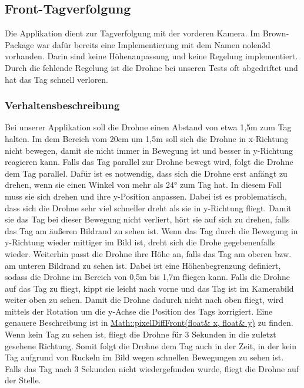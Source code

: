\subsection*{Front-\/Tagverfolgung }

Die Applikation dient zur Tagverfolgung mit der vorderen Kamera. Im Brown-\/Package war dafür bereits eine Implementierung mit dem Namen nolen3d vorhanden. Darin sind keine Höhenanpassung und keine Regelung implementiert. Durch die fehlende Regelung ist die Drohne bei unseren Tests oft abgedriftet und hat das Tag schnell verloren.

\subsubsection*{Verhaltensbeschreibung }

Bei unserer Applikation soll die Drohne einen Abstand von etwa 1,5m zum Tag halten. Im dem Bereich vom 20cm um 1,5m soll sich die Drohne in x-\/Richtung nicht bewegen, damit sie nicht immer in Bewegung ist und besser in y-\/Richtung reagieren kann. Falls das Tag parallel zur Drohne bewegt wird, folgt die Drohne dem Tag parallel. Dafür ist es notwendig, dass sich die Drohne erst anfängt zu drehen, wenn sie einen Winkel von mehr als 24° zum Tag hat. In diesem Fall muss sie sich drehen und ihre y-\/Position anpassen. Dabei ist es problematisch, dass sich die Drohne sehr viel schneller dreht als sie in y-\/Richtung fliegt. Damit sie das Tag bei dieser Bewegung nicht verliert, hört sie auf sich zu drehen, falls das Tag am äußeren Bildrand zu sehen ist. Wenn das Tag durch die Bewegung in y-\/Richtung wieder mittiger im Bild ist, dreht sich die Drohe gegebenenfalls wieder. Weiterhin passt die Drohne ihre Höhe an, falls das Tag am oberen bzw. am unteren Bildrand zu sehen ist. Dabei ist eine Höhenbegrenzung definiert, sodass die Drohne im Bereich von 0,5m bis 1,7m fliegen kann. Falls die Drohne auf das Tag zu fliegt, kippt sie leicht nach vorne und das Tag ist im Kamerabild weiter oben zu sehen. Damit die Drohne dadurch nicht nach oben fliegt, wird mittels der Rotation um die y-\/Achse die Position des Tags korrigiert. Eine genauere Beschreibung ist in \hyperlink{namespace_math_a3fbe7036db847d74ed5f2c21635d02d9}{Math::pixelDiffFront(float\& x, float\& y)} zu finden. Wenn kein Tag zu sehen ist, fliegt die Drohne für 3 Sekunden in die zuletzt gesehene Richtung. Somit folgt die Drohne dem Tag auch in der Zeit, in der kein Tag aufgrund von Ruckeln im Bild wegen schnellen Bewegungen zu sehen ist. Falls das Tag nach 3 Sekunden nicht wiedergefunden wurde, fliegt die Drohne auf der Stelle.

